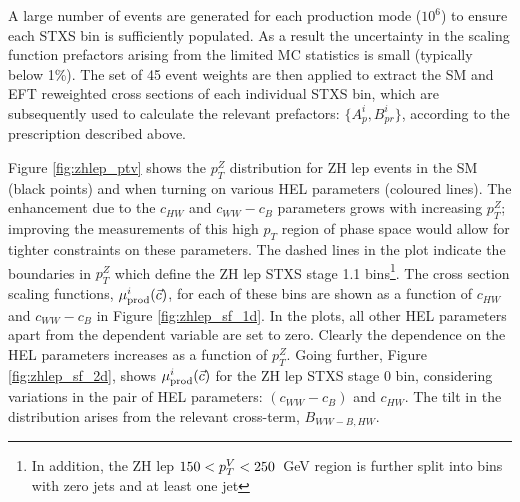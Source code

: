 A large number of events are generated for each production mode ($10^6$) to ensure each STXS bin is sufficiently populated. As a result the uncertainty in the scaling function prefactors arising from the limited MC statistics is small (typically below 1\%). The set of 45 event weights are then applied to extract the SM and EFT reweighted cross sections of each individual STXS bin, which are subsequently used to calculate the relevant prefactors: $\{A^i_p,B^i_{pr}\}$, according to the prescription described above. 


Figure \ref{fig:zhlep_ptv} shows the $p_T^Z$ distribution for ZH lep events in the SM (black points) and when turning on various HEL parameters (coloured lines). The enhancement due to the $c_{HW}$ and $c_{WW}-c_B$ parameters grows with increasing $p_T^Z$; improving the measurements of this high $p_T$ region of phase space would allow for tighter constraints on these parameters. The dashed lines in the plot indicate the boundaries in $p_T^Z$ which define the ZH lep STXS stage 1.1 bins\footnote{In addition, the ZH lep $150<p_T^V<250$~GeV region is further split into bins with zero jets and at least one jet}. The cross section scaling functions, $\mu_{\rm{prod}}^i(\vec{c})$, for each of these bins are shown as a function of $c_{HW}$ and $c_{WW}-c_B$ in Figure \ref{fig:zhlep_sf_1d}. In the plots, all other HEL parameters apart from the dependent variable are set to zero. Clearly the dependence on the HEL parameters increases as a function of $p_T^Z$. Going further, Figure \ref{fig:zhlep_sf_2d}, shows $\mu_{\rm{prod}}^i(\vec{c})$ for the ZH lep STXS stage 0 bin, considering variations in the pair of HEL parameters: $(c_{WW}-c_B)$ and $c_{HW}$. The tilt in the distribution arises from the relevant cross-term, $B_{WW-B,HW}$.

